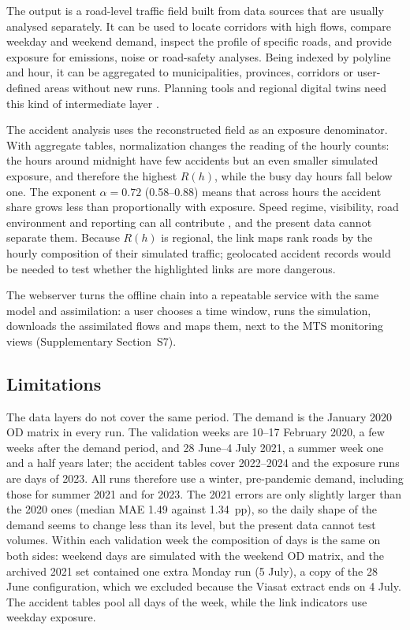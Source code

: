 \documentclass[pdflatex,Numbered]{sn-jnl}
\begin{document}
The output is a road-level traffic field built from data sources that are usually analysed separately. It can be used to locate corridors with high flows, compare weekday and weekend demand, inspect the profile of specific roads, and provide exposure for emissions, noise or road-safety analyses. Being indexed by polyline and hour, it can be aggregated to municipalities, provinces, corridors or user-defined areas without new runs. Planning tools and regional digital twins need this kind of intermediate layer \cite{batty2013,peldon2024}.

The accident analysis uses the reconstructed field as an exposure denominator. With aggregate tables, normalization changes the reading of the hourly counts: the hours around midnight have few accidents but an even smaller simulated exposure, and therefore the highest $R(h)$, while the busy day hours fall below one. The exponent $\alpha=0.72$ (0.58--0.88) means that across hours the accident share grows less than proportionally with exposure. Speed regime, visibility, road environment and reporting can all contribute \cite{elvik2005,aarts2006}, and the present data cannot separate them. Because $R(h)$ is regional, the link maps rank roads by the hourly composition of their simulated traffic; geolocated accident records would be needed to test whether the highlighted links are more dangerous.

The webserver turns the offline chain into a repeatable service with the same model and assimilation: a user chooses a time window, runs the simulation, downloads the assimilated flows and maps them, next to the MTS monitoring views (Supplementary Section~S7).

\subsection{Limitations}
\label{sec:limitations}

The data layers do not cover the same period. The demand is the January 2020 OD matrix in every run. The validation weeks are 10--17 February 2020, a few weeks after the demand period, and 28 June--4 July 2021, a summer week one and a half years later; the accident tables cover 2022--2024 and the exposure runs are days of 2023. All runs therefore use a winter, pre-pandemic demand, including those for summer 2021 and for 2023. The 2021 errors are only slightly larger than the 2020 ones (median MAE 1.49 against 1.34~pp), so the daily shape of the demand seems to change less than its level, but the present data cannot test volumes. Within each validation week the composition of days is the same on both sides: weekend days are simulated with the weekend OD matrix, and the archived 2021 set contained one extra Monday run (5 July), a copy of the 28 June configuration, which we excluded because the Viasat extract ends on 4 July. The accident tables pool all days of the week, while the link indicators use weekday exposure.
\end{document}
